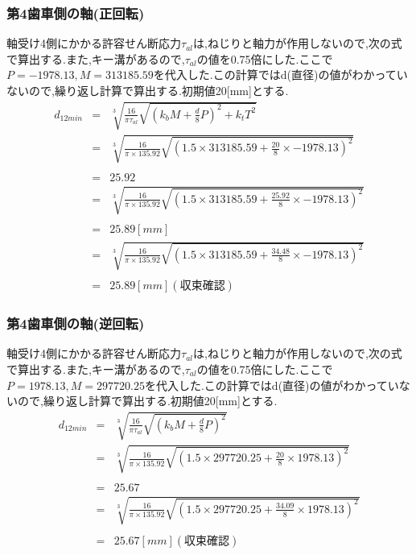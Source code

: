 \subsubsection{第4歯車側の軸(正回転)}
軸受け4側にかかる許容せん断応力$\tau_{al}$は,ねじりと軸力が作用しないので,次の式で算出する.また,キー溝があるので,$\tau_{al}$の値を0.75倍にした.ここで$P=-1978.13,M=313185.59$を代入した.この計算ではd(直径)の値がわかっていないので,繰り返し計算で算出する.初期値20[mm]とする.
\begin{eqnarray}
d_{12min}&=& \sqrt [3]{ \frac{16}{\pi \tau_{al}}\sqrt{(k_bM+\frac{d}{8}P)^2+k_tT^2} }\\
       &=& \sqrt [3]{ \frac{16}{\pi \times 135.92} \sqrt{(1.5 \times 313185.59 +\frac{20}{8}\times -1978.13)^2}}\nonumber\\
\\
       &=&25.92\\
       &=& \sqrt [3]{ \frac{16}{\pi \times 135.92} \sqrt{(1.5 \times 313185.59 +\frac{25.92}{8}\times -1978.13)^2} }\nonumber\\
\\
         &=& 25.89[mm]\\
       &=& \sqrt [3]{ \frac{16}{\pi \times 135.92} \sqrt{(1.5 \times 313185.59 +\frac{34.48}{8}\times -1978.13)^2} }\nonumber\\
\\
         &=& 25.89[mm](収束確認)
\end{eqnarray}
\subsubsection{第4歯車側の軸(逆回転)}
軸受け4側にかかる許容せん断応力$\tau_{al}$は,ねじりと軸力が作用しないので,次の式で算出する.また,キー溝があるので,$\tau_{al}$の値を0.75倍にした.ここで$P=1978.13,M=297720.25$を代入した.この計算ではd(直径)の値がわかっていないので,繰り返し計算で算出する.初期値20[mm]とする.
\begin{eqnarray}
d_{12min}&=& \sqrt [3]{ \frac{16}{\pi \tau_{al}}\sqrt{(k_bM+\frac{d}{8}P)^2} }\\
       &=& \sqrt [3]{ \frac{16}{\pi \times 135.92} \sqrt{(1.5 \times 297720.25 +\frac{20}{8}\times 1978.13)^2}}\nonumber\\
\\
       &=& 25.67\\
       &=& \sqrt [3]{ \frac{16}{\pi  \times 135.92} \sqrt{(1.5 \times 297720.25 +\frac{34.09}{8}\times 1978.13)^2}}\nonumber\\
\\
         &=& 25.67[mm](収束確認)
\end{eqnarray}
